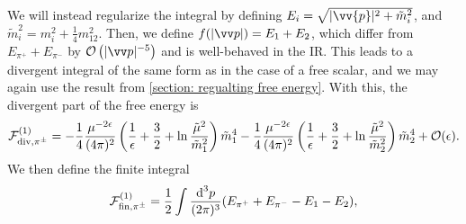We will instead regularize the integral by defining $E_i = \sqrt{|\vv{p}|^2 + \tilde m_i^2}$, and $\tilde m_i^2 = m_i^2 + \frac{1}{4} m_{12}^2$.
Then, we define $f(|\vv p|) = E_1 + E_2$, which differ from $E_{\pi^+} + E_{\pi^-}$ by $\Oh\left(|\vv p|^{-5}\right)$ and is well-behaved in the IR.
This leads to a divergent integral of the same form as in the case of a free scalar, and we may again use the result from \autoref{section: regualting free energy}.
With this, the divergent part of the free energy is
%
\begin{equation}
    \mathcal{F}^{(1)}_{\mathrm{div}, {\pi^\pm} }
    =
    - \frac{1}{4} \frac{\mu^{-2 \epsilon}}{(4\pi)^2} 
    \left(
        \frac{1}{\epsilon} + \frac{3}{2} + \ln \frac{\tilde \mu^2}{\tilde m_1^2}
    \right) \tilde m_1^4
    - \frac{1}{4} \frac{\mu^{-2 \epsilon}}{(4\pi)^2} 
    \left(
        \frac{1}{\epsilon} + \frac{3}{2} + \ln \frac{\tilde \mu^2}{\tilde m_2^2}
    \right) \tilde m_2^4
    + \mathcal{O}(\epsilon).
\end{equation}
%
We then define the finite integral
%
\begin{equation}
    \mathcal{F}^{(1)}_{\mathrm{fin}, {\pi^\pm}}
    = 
    \frac{1}{2} \int \frac{\text{d}^3 p}{(2\pi)^3} (E_{\pi^+} + E_{\pi^-} - E_1 - E_2),
\end{equation}

